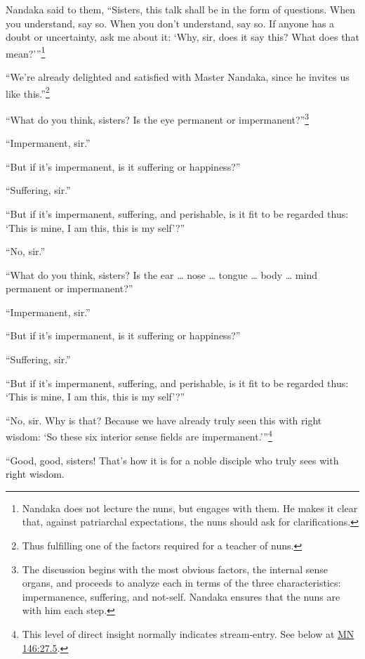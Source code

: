 \documentclass[12pt,openany]{book}%
\begin{document}
Nandaka said to them, “Sisters, this talk shall be in the form of questions. When you understand, say so. When you don’t understand, say so. If anyone has a doubt or uncertainty, ask me about it: ‘Why, sir, does it say this? What does that mean?’”\footnote{Nandaka does not lecture the nuns, but engages with them. He makes it clear that, against patriarchal expectations, the nuns should ask for clarifications. } 

“We’re already delighted and satisfied with Master Nandaka, since he invites us like this.”\footnote{Thus fulfilling one of the factors required for a teacher of nuns. } 

“What do you think, sisters? Is the eye permanent or impermanent?”\footnote{The discussion begins with the most obvious factors, the internal sense organs, and proceeds to analyze each in terms of the three characteristics: impermanence, suffering, and not-self. Nandaka ensures that the nuns are with him each step. } 

“Impermanent, sir.” 

“But if it’s impermanent, is it suffering or happiness?” 

“Suffering, sir.” 

“But if it’s impermanent, suffering, and perishable, is it fit to be regarded thus: ‘This is mine, I am this, this is my self’?” 

“No, sir.” 

“What do you think, sisters? Is the ear … nose … tongue … body … mind permanent or impermanent?” 

“Impermanent, sir.” 

“But if it’s impermanent, is it suffering or happiness?” 

“Suffering, sir.” 

“But if it’s impermanent, suffering, and perishable, is it fit to be regarded thus: ‘This is mine, I am this, this is my self’?” 

“No, sir. Why is that? Because we have already truly seen this with right wisdom: ‘So these six interior sense fields are impermanent.’”\footnote{This level of direct insight normally indicates stream-entry. See below at \href{https://suttacentral.net/mn146/en/sujato\#27.5}{MN 146:27.5}. } 

“Good, good, sisters! That’s how it is for a noble disciple who truly sees with right wisdom. 
\end{document}
